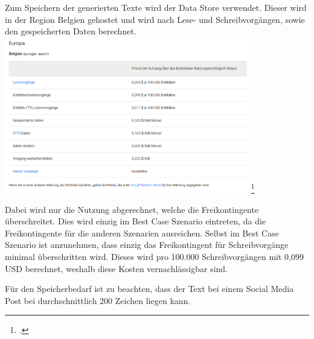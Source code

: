 Zum Speichern der generierten Texte wird der Data Store verwendet.
Dieser wird in der Region Belgien gehostet und wird nach Lese- und Schreibvorgängen, sowie den gespeicherten Daten berechnet.
\includegraphics[width=0.8\textwidth]{abbildungen/kostendatastore}
\footcite{GoogleDatastorePricing2025}

Dabei wird nur die Nutzung abgerechnet, welche die Freikontingente überschreitet.
Dies wird einzig im Best Case Szenario eintreten, da die Freikontingente für die anderen Szenarien ausreichen.
Selbst im Best Case Szenario ist anzunehmen, dass einzig das Freikontingent für Schreibvorgänge minimal überschritten wird.
Dieses wird pro 100.000 Schreibvorgängen mit 0,099 USD berechnet, weshalb diese Kosten vernachlässigbar sind.

Für den Speicherbedarf ist zu beachten, dass der Text bei einem Social Media Post bei durchschnittlich 200 Zeichen liegen kann.

